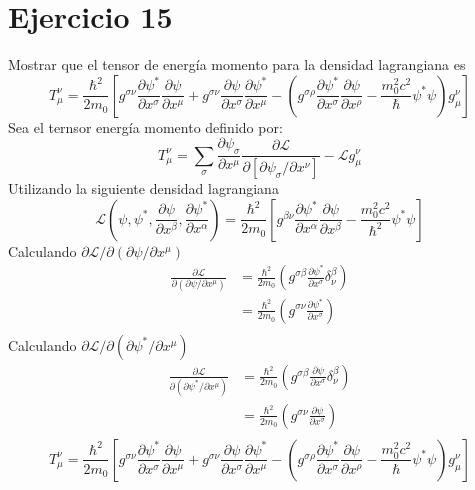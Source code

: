 \section*{Ejercicio 15}
Mostrar que el tensor de energía momento para la densidad lagrangiana es 
\begin{equation*}
    T_\mu^\nu = \frac{\hbar^2}{2m_0} \left[g^{\sigma \nu} \frac{\partial \psi^*}{\partial x^\sigma}
    \frac{\partial \psi}{\partial x^\mu}+g^{\sigma \nu} \frac{\partial \psi}{\partial x^\sigma}
    \frac{\partial \psi^*}{\partial x^\mu}-\left(g^{\sigma \rho} \frac{\partial \psi^*}{\partial x^\sigma}
    \frac{\partial \psi}{\partial x^\rho}-\frac{m_0^2 c^2}{\hbar}\psi^*\psi\right)g_\mu^\nu\right]
\end{equation*}
Sea el ternsor energía momento definido por:
\begin{equation*}
    T_\mu^\nu = \sum\limits_{\sigma} \frac{\partial \psi_\sigma}{\partial x^\mu} \frac{\partial \mathcal{L}}{\partial \left[\partial \psi_\sigma / \partial x^\nu\right]}- \mathcal{L} g_\mu^\nu 
\end{equation*}
Utilizando la siguiente densidad lagrangiana
\begin{equation*}
    \mathcal{L}\left(\psi,\psi^*, \frac{\partial \psi}{\partial x^\beta},\frac{\partial \psi^*}{\partial x^\alpha} \right)= \frac{\hbar^2}{2m_0} \left[g^{\beta \nu}\frac{\partial \psi^*}{\partial x^\alpha}\frac{\partial \psi}{\partial x^\beta}-\frac{m_0^2c^2}{\hbar^2}\psi^*\psi \right]
\end{equation*}
Calculando $\partial \mathcal{L}/ \partial (\partial \psi / \partial x^\mu )$
\begin{align*}
    \frac{\partial \mathcal{L}}{\partial (\partial \psi / \partial x^\mu)} &= \frac{\hbar^2}{2m_0}\left(g^{\sigma \beta} \frac{\partial \psi^*}{\partial x^{\sigma}} \delta_\nu^\beta\right)\\
    & =\frac{\hbar^2}{2m_0}\left( g^{\sigma \nu } \frac{\partial \psi^*}{\partial x^{\sigma}}\right)\\
\end{align*}
Calculando $\partial \mathcal{L}/ \partial (\partial \psi^* / \partial x^\mu )$
\begin{align*}
    \frac{\partial \mathcal{L}}{\partial (\partial \psi^* / \partial x^\mu)} &= \frac{\hbar^2}{2m_0}\left(g^{\sigma \beta} \frac{\partial \psi}{\partial x^{\sigma}} \delta_\nu^\beta\right)\\
    & =\frac{\hbar^2}{2m_0}\left( g^{\sigma \nu } \frac{\partial \psi}{\partial x^{\sigma}}\right)\\
\end{align*}
    \begin{equation*}
        T_\mu^\nu = \frac{\hbar^2}{2m_0} \left[g^{\sigma \nu} \frac{\partial \psi^*}{\partial x^\sigma}
        \frac{\partial \psi}{\partial x^\mu}+g^{\sigma \nu} \frac{\partial \psi}{\partial x^\sigma}
        \frac{\partial \psi^*}{\partial x^\mu}-\left(g^{\sigma \rho} \frac{\partial \psi^*}{\partial x^\sigma}
        \frac{\partial \psi}{\partial x^\rho}-\frac{m_0^2 c^2}{\hbar}\psi^*\psi\right)g_\mu^\nu\right]
    \end{equation*}